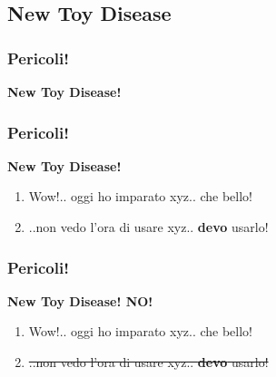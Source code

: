 \documentclass{beamer}
\begin{document}
\subsection{New Toy Disease}
\begin{frame}
	\frametitle{Pericoli!}
	\begin{center}
		\textbf{New Toy Disease!}
	\end{center}
	\begin{center}
	\end{center}
\end{frame}

\begin{frame}
	\frametitle{Pericoli!}
	\begin{center}
		\textbf{New Toy Disease!}
	\end{center}
	\begin{enumerate}
  		\item<1-> Wow!.. oggi ho imparato xyz.. che bello!
  		\item<2-> ..non vedo l'ora di usare xyz.. \textbf{devo} usarlo!
	\end{enumerate}
\end{frame}

\begin{frame}
	\frametitle{Pericoli!}
	\begin{center}
		\textbf{New Toy Disease! NO!}
	\end{center}
	\begin{enumerate}
  		\item Wow!.. oggi ho imparato xyz.. che bello!
  		\item \st{..non vedo l'ora di usare xyz.. \textbf{devo} usarlo!}
	\end{enumerate}
\end{frame}
\end{document}
